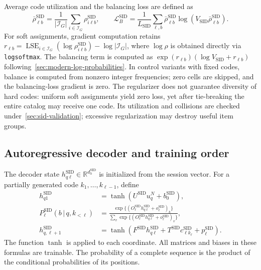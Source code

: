 \documentclass[12pt,a4paper]{article}
\newcommand{\code}[1]{{\ttfamily\small\nolinkurl{#1}}}
\newcommand{\R}{\mathbb R}
\newcommand{\given}{\,\vert\,}
\theoremstyle{plainru}
\begin{document}
Average code utilization and the balancing loss are defined as
\begin{equation}\label{eq:sid-balance}
 \bar\rho_{\ell b}^{\mathrm{SID}}
 =\frac{1}{|\mathcal I_G|}\sum_{i\in\mathcal I_G}
          \rho_{i\ell b}^{\mathrm{SID}},
 \qquad
 \mathcal L_B^{\mathrm{SID}}
 =\frac{1}{L_{\mathrm{SID}}}\sum_{\ell,b}
  \bar\rho_{\ell b}^{\mathrm{SID}}
            \log(V_{\mathrm{SID}}\bar\rho_{\ell b}^{\mathrm{SID}}).
\end{equation}
For soft assignments, gradient computation retains
$r_{\ell b}=\operatorname{LSE}_{i\in\mathcal I_G}
(\log\rho_{i\ell b}^{\mathrm{SID}})-\log|\mathcal I_G|$,
where $\log\rho$ is obtained directly via \code{logsoftmax}.
The balancing term is computed as $\exp(r_{\ell b})
(\log V_{\mathrm{SID}}+r_{\ell b})$ following~\ref{sec:modern-log-probabilities}.
In control variants with fixed codes, balance is computed from
nonzero integer frequencies; zero cells are skipped,
and the balancing-loss gradient is zero.
The regularizer does not guarantee diversity of hard codes: uniform
soft assignments yield zero loss, yet after tie-breaking
the entire catalog may receive one code. Its utilization and collisions
are checked under~\ref{sec:sid-validation}; excessive regularization
may destroy useful item groups.

\subsection{Autoregressive decoder and training order}
\label{sec:sid-decoder}

The decoder state $h_{q\ell}^{\mathrm{SID}}\in\R^{d_h^{\mathrm{SID}}}$
is initialized from the session vector. For a partially generated code
$k_1,\ldots,k_{\ell-1}$, define
\begin{align}\label{eq:sid-decoder}
 h_{q1}^{\mathrm{SID}}&=\tanh(U^{\mathrm{SID}}u_q^N+b_0^{\mathrm{SID}}),\\
 P_\ell^{\mathrm{SID}}(b\given q,k_{<\ell})
 &=\frac{\exp\{(O_\ell^{\mathrm{SID}}h_{q\ell}^{\mathrm{SID}}
                         +o_\ell^{\mathrm{SID}})_b\}}
 {\sum_v\exp\{(O_\ell^{\mathrm{SID}}h_{q\ell}^{\mathrm{SID}}
                         +o_\ell^{\mathrm{SID}})_v\}},\\
 h_{q,\ell+1}^{\mathrm{SID}}
 &=\tanh(F^{\mathrm{SID}}h_{q\ell}^{\mathrm{SID}}
       +T^{\mathrm{SID}}c_{\ell k_\ell}^{\mathrm{SID}}
       +p_\ell^{\mathrm{SID}}).
\end{align}
The function $\tanh$ is applied to each coordinate.
All matrices and biases in these formulas are trainable.
The probability of a complete sequence is the product
of the conditional probabilities of its positions.
\end{document}
